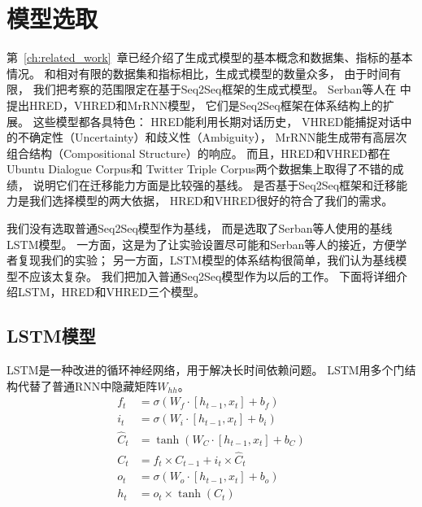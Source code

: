 \section{模型选取}\label{sec:model_selection}
第~\ref{ch:related_work}~章已经介绍了生成式模型的基本概念和数据集、指标的基本情况。
和相对有限的数据集和指标相比，生成式模型的数量众多，
由于时间有限，
我们把考察的范围限定在基于Seq2Seq框架的生成式模型。
Serban等人在
中提出HRED，VHRED和MrRNN模型，
它们是Seq2Seq框架在体系结构上的扩展。
这些模型都各具特色：
HRED能利用长期对话历史，
VHRED能捕捉对话中的不确定性（Uncertainty）和歧义性（Ambiguity），
MrRNN能生成带有高层次组合结构（Compositional Structure）的响应。
而且，HRED和VHRED都在Ubuntu Dialogue Corpus和
Twitter Triple Corpus两个数据集上取得了不错的成绩，
说明它们在迁移能力方面是比较强的基线。
是否基于Seq2Seq框架和迁移能力是我们选择模型的两大依据，
HRED和VHRED很好的符合了我们的需求。

我们没有选取普通Seq2Seq模型作为基线，
而是选取了Serban等人使用的基线LSTM模型。
一方面，这是为了让实验设置尽可能和Serban等人的接近，方便学者复现我们的实验；
另一方面，LSTM模型的体系结构很简单，我们认为基线模型不应该太复杂。
我们把加入普通Seq2Seq模型作为以后的工作。
下面将详细介绍LSTM，HRED和VHRED三个模型。

\subsection{LSTM模型}\label{subsec:LSTM}
LSTM是一种改进的循环神经网络，用于解决长时间依赖问题。
LSTM用多个门结构代替了普通RNN中隐藏矩阵$W_{hh}$。
\begin{align}
    f_t &= \sigma(W_f \cdot [h_{t-1}, x_t] + b_f) \\
    i_t &= \sigma(W_i \cdot [h_{t-1}, x_t] + b_i) \\
    \hat{C}_t &= \tanh(W_C \cdot [h_{t-1}, x_t] + b_C) \\
    C_t &= f_t \times C_{t-1} + i_t \times \hat{C}_t \\
    o_t &= \sigma(W_o \cdot [h_{t-1}, x_t] + b_o) \\
    h_t &= o_t \times \tanh(C_t)
    \label{eqn:LSTM_formula}
\end{align}

